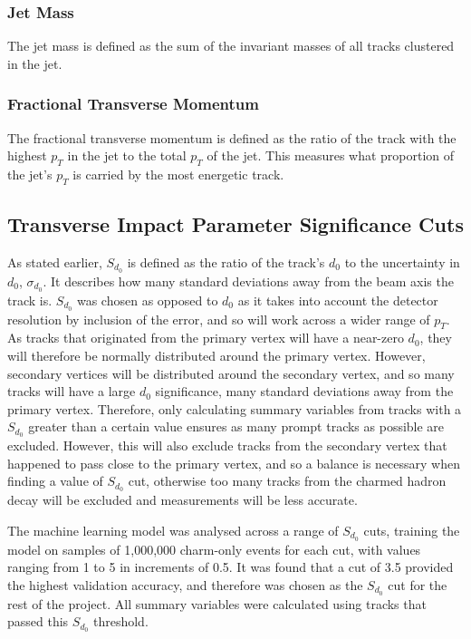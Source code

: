 \documentclass[12pt]{article}
\begin{document}
\subsubsection*{Jet Mass}
The jet mass is defined as the sum of the invariant masses of all tracks clustered in the jet.

\subsubsection*{Fractional Transverse Momentum}
The fractional transverse momentum is defined as the ratio of the track with the highest $p_T$ in the jet to the total $p_T$ of the jet. This measures what proportion of the jet's $p_T$ is carried by the most energetic track.

\subsection{Transverse Impact Parameter Significance Cuts}
As stated earlier, $S_{d_0}$ is defined as the ratio of the track's $d_0$ to the uncertainty in $d_0$, $\sigma_{d_0}$. It describes how many standard deviations away from the beam axis the track is. $S_{d_0}$ was chosen as opposed to $d_0$ as it takes into account the detector resolution by inclusion of the error, and so will work across a wider range of $p_T$. As tracks that originated from the primary vertex will have a near-zero $d_0$, they will therefore be normally distributed around the primary vertex. However, secondary vertices will be distributed around the secondary vertex, and so many tracks will have a large $d_0$ significance, many standard deviations away from the primary vertex. Therefore, only calculating summary variables from tracks with a $S_{d_0}$ greater than a certain value ensures as many prompt tracks as possible are excluded. However, this will also exclude tracks from the secondary vertex that happened to pass close to the primary vertex, and so a balance is necessary when finding a value of $S_{d_0}$ cut, otherwise too many tracks from the charmed hadron decay will be excluded and measurements will be less accurate.

The machine learning model was analysed across a range of $S_{d_0}$ cuts, training the model on samples of 1,000,000 charm-only events for each cut, with values ranging from 1 to 5 in increments of 0.5. It was found that a cut of 3.5 provided the highest validation accuracy, and therefore was chosen as the $S_{d_0}$ cut for the rest of the project. All summary variables were calculated using tracks that passed this $S_{d_0}$ threshold.
\end{document}

